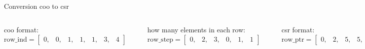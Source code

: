 \documentclass[aspectratio=169,xcolor=dvipsnames]{beamer}
\begin{document}
\begin{frame}{Conversion coo to csr}
    \begin{columns}[c] %

coo format: \\
$\mathrm{row\_ind} = \begin{bmatrix}
		0, & 0, & 1, & 1, & 1, & 3, & 4 
		\end{bmatrix}$

\begin{center}
    \includegraphics[width=0.7\linewidth]{conversion1.png}
    \end{center}

how many elements in each row:
$\mathrm{row\_step} = \begin{bmatrix}
		0, & 2, & 3, & 0, & 1, & 1 
		\end{bmatrix}$

\begin{center}
    \includegraphics[width=0.7\linewidth]{conversion2.png}
    \end{center}

csr format: \\
$\mathrm{row\_ptr} = \begin{bmatrix}
		0, & 2, & 5, & 5, & 6, & 7 
		\end{bmatrix}$

        
        $ \left( \begin{array}{rrrrr} 
0 & 5.3 & 0 & 0 & 1.5\\ 
4.2 & 0& 3.1 & 0 & 2\\ 
0 & 0 & 0 & 0 & 0 \\
0 & 0 & 0 & 2.2 & 0 \\
1.9 & 0 & 0 & 0 & 0
\end{array} \right) $

    \end{columns}
\end{frame}
\end{document}
